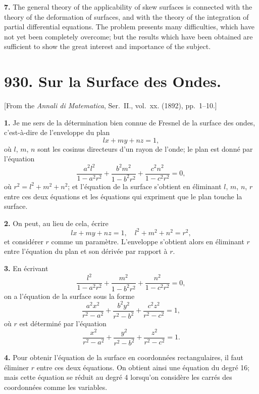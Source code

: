 \documentclass[11pt,a4paper]{book}
\begin{document}
{{{\textbf{7.} The general theory of the applicability of skew surfaces is connected
with the theory of the deformation of surfaces, and with the theory of the
integration of partial differential equations. The problem presents many difficulties,
which have not yet been completely overcome; but the results which have been
obtained are sufficient to show the great interest and importance of the subject.



\newpage
\section*{930. Sur la Surface des Ondes.}

[From the \textit{Annali di Matematica}, Ser.~II., vol.~xx. (1892), pp.~1--10.]

\bigskip

\textbf{1.} Je me sers de la d\'etermination bien connue de Fresnel de la surface
des ondes, c'est-\`a-dire de l'enveloppe du plan
\[
lx + my + nz = 1,
\]
o\`u $l$, $m$, $n$ sont les cosinus directeurs d'un rayon de l'onde; le plan est donn\'e par
l'\'equation
\[
\frac{a^2l^2}{1-a^2r^2} + \frac{b^2m^2}{1-b^2r^2} + \frac{c^2n^2}{1-c^2r^2} = 0,
\]
o\`u $r^2 = l^2 + m^2 + n^2$; et l'\'equation de la surface s'obtient en \'eliminant $l$, $m$, $n$, $r$
entre ces deux \'equations et les \'equations qui expriment que le plan touche la surface.

\textbf{2.} On peut, au lieu de cela, \'ecrire
\[
lx + my + nz = 1, \quad l^2 + m^2 + n^2 = r^2,
\]
et consid\'erer $r$ comme un param\`etre. L'enveloppe s'obtient alors en \'eliminant
$r$ entre l'\'equation du plan et son d\'eriv\'ee par rapport \`a $r$.

\textbf{3.} En \'ecrivant
\[
\frac{l^2}{1-a^2r^2} + \frac{m^2}{1-b^2r^2} + \frac{n^2}{1-c^2r^2} = 0,
\]
on a l'\'equation de la surface sous la forme
\[
\frac{a^2x^2}{r^2-a^2} + \frac{b^2y^2}{r^2-b^2} + \frac{c^2z^2}{r^2-c^2} = 1,
\]
o\`u $r$ est d\'etermin\'e par l'\'equation
\[
\frac{x^2}{r^2-a^2} + \frac{y^2}{r^2-b^2} + \frac{z^2}{r^2-c^2} = 1.
\]

\textbf{4.} Pour obtenir l'\'equation de la surface en coordonn\'ees rectangulaires,
il faut \'eliminer $r$ entre ces deux \'equations. On obtient ainsi une \'equation du
degr\'e 16; mais cette \'equation se r\'eduit au degr\'e 4 lorsqu'on consid\`ere les
carr\'es des coordonn\'ees comme les variables.

}}}
\end{document}
